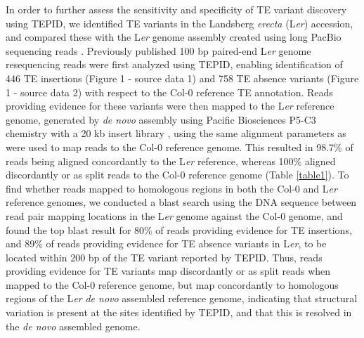 \documentclass[12pt]{article}
\begin{document}
In order to further assess the sensitivity and specificity of TE variant
discovery using TEPID, we identified TE variants in the Landsberg
\emph{erecta} (L\emph{er}) accession, and compared these with the
L\emph{er }genome assembly created using long PacBio sequencing reads
\cite{Chin:2013iw}. Previously published 100 bp paired-end L\emph{er}
genome resequencing reads \cite{Schneeberger:2011ft} were first analyzed
using TEPID, enabling identification of 446 TE insertions (Figure 1 -
source data 1) and 758 TE absence variants (Figure 1 - source data 2)
with respect to the Col-0 reference TE annotation. Reads providing
evidence for these variants were then mapped to the L\emph{er} reference
genome, generated by \emph{de novo} assembly using Pacific Biosciences
P5-C3 chemistry with a 20 kb insert library \cite{Chin:2013iw}, using
the same alignment parameters as were used to map reads to the Col-0
reference genome. This resulted in 98.7\% of reads being aligned
concordantly to the L\emph{er} reference, whereas 100\% aligned
discordantly or as split reads to the Col-0 reference genome (Table \ref{table1}).
To find whether reads mapped to homologous regions in both the Col-0 and
L\emph{er} reference genomes, we conducted a blast search
\cite{Camacho:2009fc} using the DNA sequence between read pair mapping
locations in the L\emph{er }genome against the Col-0 genome, and found
the top blast result for 80\% of reads providing evidence for TE
insertions, and 89\% of reads providing evidence for TE absence variants
in L\emph{er}, to be located within 200 bp of the TE variant
reported by TEPID. Thus, reads providing evidence for TE variants map
discordantly or as split reads when mapped to the Col-0 reference
genome, but map concordantly to homologous regions of the L\emph{er} \emph{de
novo} assembled reference genome, indicating that structural variation
is present at the sites identified by TEPID, and that this is resolved
in the \emph{de novo} assembled genome.
\end{document}
